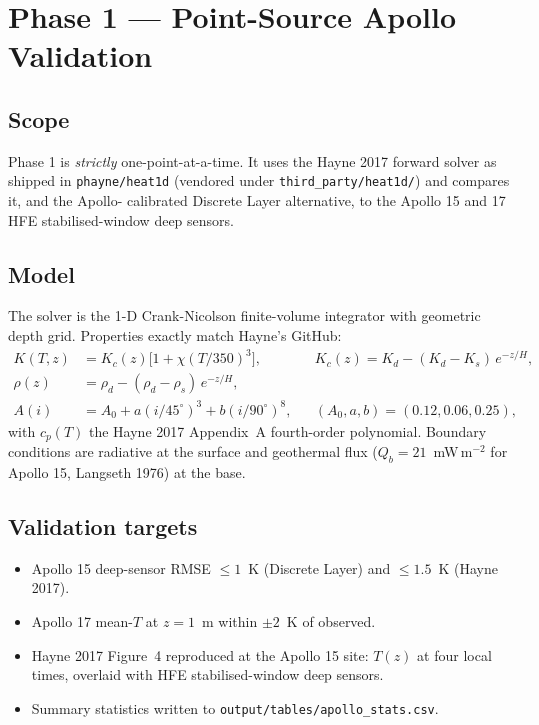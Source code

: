 \documentclass[11pt,a4paper]{book}
\begin{document}
\chapter{Phase 1 --- Point-Source Apollo Validation}
\section{Scope}
Phase 1 is \emph{strictly} one-point-at-a-time. It uses the Hayne 2017
forward solver as shipped in \texttt{phayne/heat1d} (vendored under
\texttt{third\_party/heat1d/}) and compares it, and the Apollo-
calibrated Discrete Layer alternative, to the Apollo 15 and 17 HFE
stabilised-window deep sensors.

\section{Model}
The solver is the 1-D Crank-Nicolson finite-volume integrator with
geometric depth grid. Properties exactly match Hayne's GitHub:
\begin{align}
K(T,z) &= K_c(z)\bigl[1 + \chi(T/350)^3\bigr],
&& K_c(z) = K_d - (K_d-K_s)\,e^{-z/H}, \\
\rho(z) &= \rho_d - (\rho_d-\rho_s)\,e^{-z/H}, \\
A(i) &= A_0 + a\left(i/45^\circ\right)^3 + b\left(i/90^\circ\right)^8,
&& (A_0,a,b) = (0.12,0.06,0.25),
\end{align}
with $c_p(T)$ the Hayne 2017 Appendix~A fourth-order polynomial.
Boundary conditions are radiative at the surface and geothermal flux
($Q_b = 21$~mW\,m$^{-2}$ for Apollo 15, Langseth 1976) at the base.

\section{Validation targets}
\begin{itemize}
\item Apollo 15 deep-sensor RMSE $\le 1$~K (Discrete Layer) and $\le 1.5$~K (Hayne 2017).
\item Apollo 17 mean-$T$ at $z = 1$~m within $\pm 2$~K of observed.
\item Hayne 2017 Figure~4 reproduced at the Apollo 15 site: $T(z)$ at
      four local times, overlaid with HFE stabilised-window deep sensors.
\item Summary statistics written to \texttt{output/tables/apollo\_stats.csv}.
\end{itemize}
\end{document}
